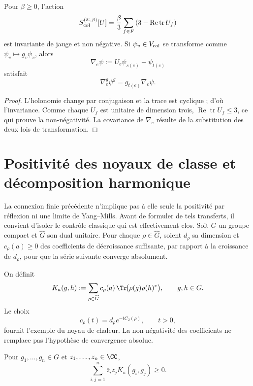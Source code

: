 \begin{proposition}
\label{prop:wilson-color-finito}
Pour \(\beta\ge0\), l'action
\[
 S_{\rm col}^{(\mathcal K,\beta)}[U]
 =\frac{\beta}{3}\sum_{f\in F}
 \left(3-\operatorname{Re}\operatorname{tr}U_f\right)
\]
est invariante de jauge et non négative. Si
\(\psi_v\in V_{\rm col}\) se transforme comme
\(\psi_v\mapsto g_v\psi_v\), alors
\[
 \nabla_e\psi:=U_e\psi_{s(e)}-\psi_{t(e)}
\]
satisfait
\[
 \nabla_e^g\psi^g=g_{t(e)}\nabla_e\psi.
\]
\end{proposition}

\begin{proof}
L'holonomie change par conjugaison et la trace est cyclique ; d'où
l'invariance. Comme chaque \(U_f\) est unitaire de dimension trois,
\(\operatorname{Re}\operatorname{tr}U_f\le3\), ce qui prouve la
non-négativité. La covariance de \(\nabla_e\) résulte de la substitution des deux lois
de transformation.
\end{proof}

\section{Positivité des noyaux de classe et décomposition harmonique}

La connexion finie précédente n'implique pas à elle seule la positivité par
réflexion ni une limite de Yang--Mills. Avant de formuler de tels transferts,
il convient d'isoler le contrôle classique qui est effectivement clos. Soit \(G\) un groupe
compact et \(\widehat G\) son dual unitaire. Pour chaque
\(\rho\in\widehat G\), soient \(d_\rho\) sa dimension et
\(c_\rho(a)\ge0\) des coefficients de décroissance suffisante, par rapport à la
croissance de \(d_\rho\), pour que la série suivante converge
absolument.

\begin{definition}
\label{pf84:YM-07}
On définit
\[
 K_a(g,h):=
 \sum_{\rho\in\widehat G}
 c_\rho(a)\,
 \Tr\!\bigl(\rho(g)\rho(h)^*\bigr),
 \qquad g,h\in G.
\]
Le choix
\[
 c_\rho(t)=d_\rho e^{-tC_2(\rho)},
 \qquad t>0,
\]
fournit l'exemple du noyau de chaleur. La non-négativité des
coefficients ne remplace pas l'hypothèse de convergence absolue.
\end{definition}

\begin{theorem}
\label{pf84:YM-08} Pour \(g_1,\dots,g_n\in G\) et \(z_1,\dots,z_n\in\CC\),
\[
 \sum_{i,j=1}^n
 \overline z_i z_jK_a(g_i,g_j)\ge0.
\]
\end{theorem}

